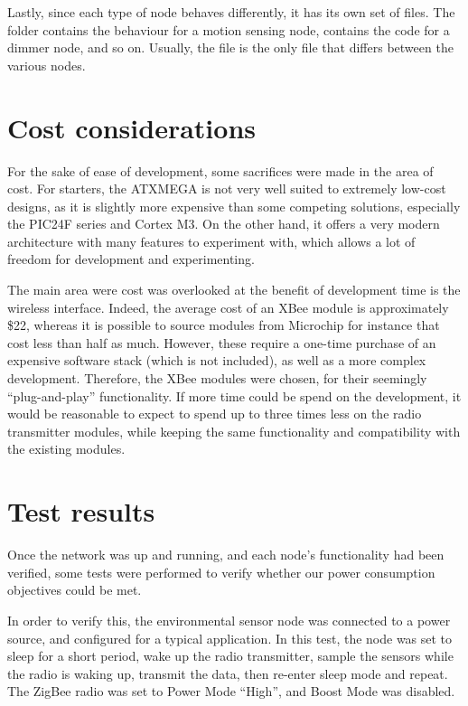 Lastly, since each type of node behaves differently, it has its own set of
files. The  folder contains the behaviour for a motion
sensing node,  contains the code for a dimmer node, and so
on. Usually, the  file is the only file that differs between the
various nodes.

\section{Cost considerations}

For the sake of ease of development, some sacrifices were made in the area of
cost. For starters, the ATXMEGA is not very well suited to extremely low-cost
designs, as it is slightly more expensive than some competing solutions,
especially the PIC24F series and Cortex M3. On the other hand, it offers a very
modern architecture with many features to experiment with, which allows a lot of
freedom for development and experimenting.


The main area were cost was overlooked at the benefit of development time
is the wireless interface. Indeed, the average cost of an XBee module is
approximately \$22, whereas it is possible to source modules from Microchip for
instance that cost less than half as much. However, these require a one-time
purchase of an expensive software stack (which is not included), as well as a
more complex development. Therefore, the XBee modules were chosen, for their
seemingly ``plug-and-play'' functionality. If more time could be spend on the
development, it would be reasonable to expect to spend up to three times less on
the radio transmitter modules, while keeping the same functionality and
compatibility with the existing modules.


\section{Test results}

Once the network was up and running, and each node's functionality had been
verified, some tests were performed to verify whether our power consumption
objectives could be met.

In order to verify this, the environmental sensor node was connected to a power
source, and configured for a typical application. In this test, the node was set
to sleep for a short period, wake up the radio transmitter, sample the sensors
while the radio is waking up, transmit the data, then re-enter sleep mode and
repeat. The ZigBee radio was set to Power Mode ``High'', and Boost Mode was
disabled.

